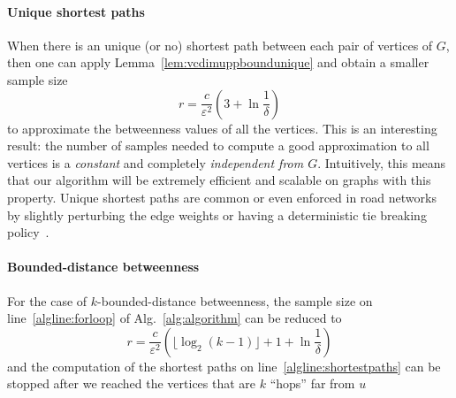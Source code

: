 \paragraph{Unique shortest paths} When there is an unique (or no) shortest
path between each pair of vertices of $G$, then one can apply
Lemma~\ref{lem:vcdimuppboundunique} and obtain a smaller sample size
\[
  r= \frac{c}{\varepsilon^2}\left(3+\ln\frac{1}{\delta}\right)
\]
to approximate the betweenness values of all the vertices. 
This is an interesting result: the number of samples needed to compute a good
approximation to all vertices is a \emph{constant} and completely
\emph{independent from $G$}. Intuitively, this means that our algorithm will be
extremely efficient and scalable on graphs with this property. Unique shortest
paths are common or even enforced in road networks by slightly perturbing the
edge weights or having a deterministic tie breaking
policy~\citep{GeisbergerSS08}.

\paragraph{Bounded-distance betweenness} For the case of
$k$-bounded-distance betweenness, the sample size on line~\ref{algline:forloop}
of Alg.~\ref{alg:algorithm} can be reduced to 
\[ 
  r= \frac{c}{\varepsilon^2}\left(\lfloor\log_2(k-1)\rfloor + 1 +\ln\frac{1}{\delta}\right)
\]
and the computation of the shortest paths on line~\ref{algline:shortestpaths}
can be stopped after we reached the vertices that are $k$ ``hops'' far from $u$


